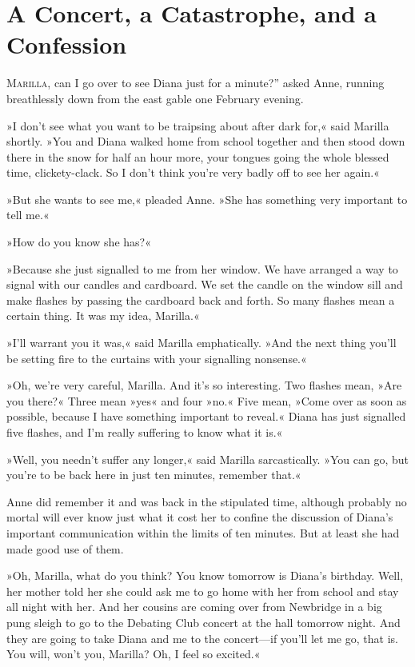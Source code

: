 \chapter{A Concert, a Catastrophe, and a Confession}
	
\lettrine[ante=“,lines=4]{M}{arilla}, can I go over to see Diana just for a minute?” asked Anne, running breathlessly down from the east gable one February evening.

\zz
»I don’t see what you want to be traipsing about after dark for,« said Marilla shortly. »You and Diana walked home from school together and then stood down there in the snow for half an hour more, your tongues going the whole blessed time, clickety-clack. So I don’t think you’re very badly off to see her again.«

»But she wants to see me,« pleaded Anne. »She has something very important to tell me.«

»How do you know she has?«

»Because she just signalled to me from her window. We have arranged a way to signal with our candles and cardboard. We set the candle on the window sill and make flashes by passing the cardboard back and forth. So many flashes mean a certain thing. It was my idea, Marilla.«

»I’ll warrant you it was,« said Marilla emphatically. »And the next thing you’ll be setting fire to the curtains with your signalling nonsense.«

»Oh, we’re very careful, Marilla. And it’s so interesting. Two flashes mean, »Are you there?« Three mean »yes« and four »no.« Five mean, »Come over as soon as possible, because I have something important to reveal.« Diana has just signalled five flashes, and I’m really suffering to know what it is.«

»Well, you needn’t suffer any longer,« said Marilla sarcastically. »You can go, but you’re to be back here in just ten minutes, remember that.«

Anne did remember it and was back in the stipulated time, although probably no mortal will ever know just what it cost her to confine the discussion of Diana’s important communication within the limits of ten minutes. But at least she had made good use of them.

»Oh, Marilla, what do you think? You know tomorrow is Diana’s birthday. Well, her mother told her she could ask me to go home with her from school and stay all night with her. And her cousins are coming over from Newbridge in a big pung sleigh to go to the Debating Club concert at the hall tomorrow night. And they are going to take Diana and me to the concert—if you’ll let me go, that is. You will, won’t you, Marilla? Oh, I feel so excited.«

